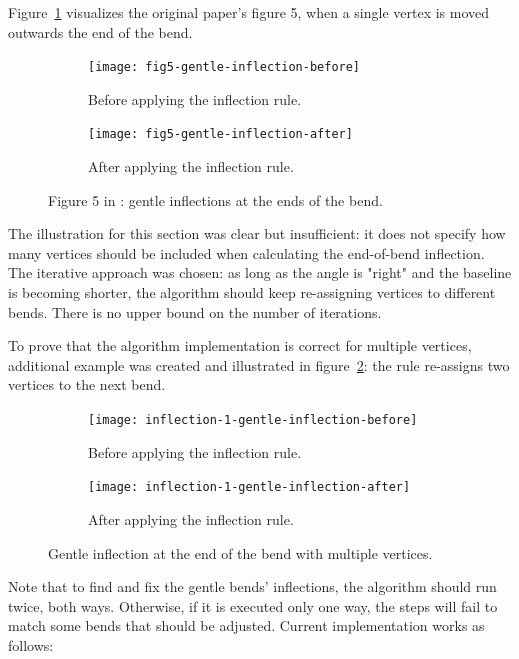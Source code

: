 \documentclass[a4paper]{article}
\begin{document}
Figure~\ref{fig:fig5-gentle-inflection} visualizes the original paper's figure 5,
when a single vertex is moved outwards the end of the bend.

\begin{figure}[ht]
    \centering
    \begin{subfigure}[b]{.49\textwidth}
        \texttt{[image: fig5-gentle-inflection-before]}
        \caption{Before applying the inflection rule.}
    \end{subfigure}
    \hfill
    \begin{subfigure}[b]{.49\textwidth}
        \texttt{[image: fig5-gentle-inflection-after]}
        \caption{After applying the inflection rule.}
    \end{subfigure}
    \caption{Figure 5 in \cite{wang1998line}: gentle inflections at the ends of
    the bend.}
    \label{fig:fig5-gentle-inflection}
\end{figure}


The illustration for this section was clear but insufficient: it does not
specify how many vertices should be included when calculating the end-of-bend
inflection. The iterative approach was chosen: as long as the angle is
"right" and the baseline is becoming shorter, the algorithm should keep
re-assigning vertices to different bends. There is no upper bound
on the number of iterations.

To prove that the algorithm implementation is correct for multiple vertices,
additional example was created and illustrated in
figure~\ref{fig:inflection-1-gentle-inflection}: the rule re-assigns two
vertices to the next bend.

\begin{figure}[ht]
    \centering
    \begin{subfigure}[b]{.49\textwidth}
        \texttt{[image: inflection-1-gentle-inflection-before]}
        \caption{Before applying the inflection rule.}
    \end{subfigure}
    \hfill
    \begin{subfigure}[b]{.49\textwidth}
        \texttt{[image: inflection-1-gentle-inflection-after]}
        \caption{After applying the inflection rule.}
    \end{subfigure}
    \caption{Gentle inflection at the end of the bend with multiple vertices.}
    \label{fig:inflection-1-gentle-inflection}
\end{figure}

Note that to find and fix the gentle bends' inflections, the algorithm should
run twice, both ways. Otherwise, if it is executed only one way, the steps will
fail to match some bends that should be adjusted. Current implementation works
as follows:
\end{document}
